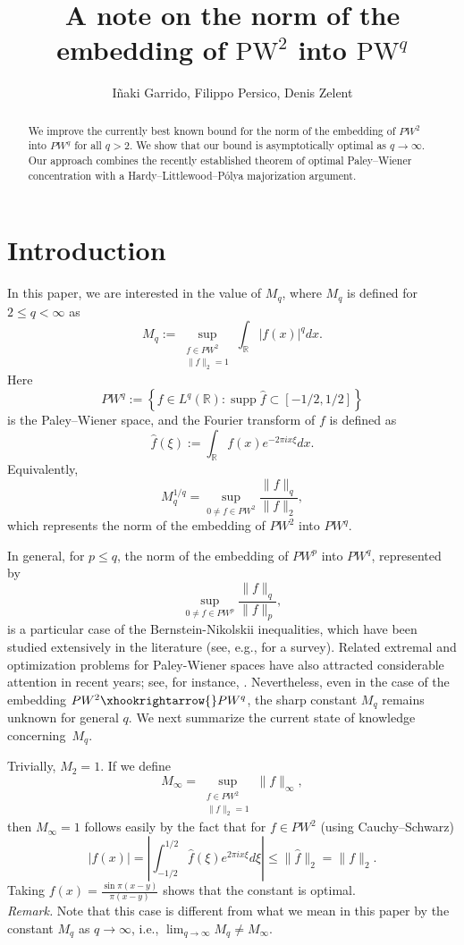 \documentclass[11pt, a4paper, reqno]{amsart}
\title{A note on the norm of the embedding of $\text{PW}^2$ into $\text{PW}^q$}
\author{Iñaki Garrido, Filippo Persico, Denis Zelent}
\theoremstyle{remark}
\begin{document}
\begin{abstract}
   We improve the currently best known bound for the norm of the embedding of $PW^2$ into $PW^q$ for all $q>2$. We show that our bound is asymptotically optimal as $q\to \infty$. Our approach combines the recently established theorem of optimal Paley--Wiener concentration with a Hardy--Littlewood--Pólya majorization argument.
\end{abstract}
\maketitle
\section{Introduction}
In this paper, we are interested in the value of $M_q$, where $M_q$ is defined for $2\leq q < \infty$ as 
$$ M_q := \sup_{\substack{f\in PW^2\\ \|f\|_2=1}}
\int_{\mathbb{R}}|f(x)|^q dx. $$
Here
$$ PW^q := \left\{f\in L^q(\mathbb{R}): \operatorname{supp}\widehat f\subset[-1/2,1/2] \right\} $$
is the Paley--Wiener space, and the Fourier transform of $f$ is defined as 
$$ \widehat f(\xi) := \int_{\mathbb{R}} f(x)e^{-2\pi i x\xi} dx.$$
Equivalently,
$$ M_q^{1/q} = \sup_{0\neq f\in PW^2}
\frac{\|f\|_q}{\|f\|_2}, $$
which represents the norm of the embedding of $PW^2$ into $PW^q$.

In general, for $p\leq q$, the norm of the embedding of $PW^p$ into $PW^q$, represented by 
$$ \sup_{0\neq f\in PW^p} \frac{\|f\|_q}{\|f\|_p},$$
is a particular case of the Bernstein-Nikolskii inequalities, which have been studied extensively in the literature (see, e.g., \cite{Ganzburg1} for a survey). Related extremal and optimization problems for Paley-Wiener spaces have also attracted considerable attention in recent years; see, for instance, \cite{Brevig, CarneiroEMB, CarneiroFOPT, instanes2024}.
Nevertheless, even in the case of the embedding $PW^2 \xhookrightarrow{} PW^q$, the sharp constant $M_q$ remains unknown for general $q$. We next summarize the current state of knowledge concerning~$M_q$.

Trivially, $M_2 = 1$. 
If we define 
$$ M_{\infty} = \sup_{\substack{f\in PW^2\\ \|f\|_2=1}}\|f\|_{\infty}, $$ then $M_{\infty}=1$ follows easily by the fact that for $f\in PW^2$ (using Cauchy--Schwarz)
$$|f(x)| = \left|\int_{-1/2}^{1/2}\hat{f}(\xi)e^{2\pi i x \xi}d\xi\right| \leq \|\hat{f}\|_2 = \|f\|_2.$$
Taking $f(x) = \frac{\sin \pi(x-y)}{\pi(x-y)}$ shows that the constant is optimal.\\
\textsl{Remark.} Note that this case is different from what we mean in this paper by the constant $M_q$ as $q\to \infty$, i.e., $\lim_{q\to \infty} M_q \neq M_{\infty}$.
\end{document}
